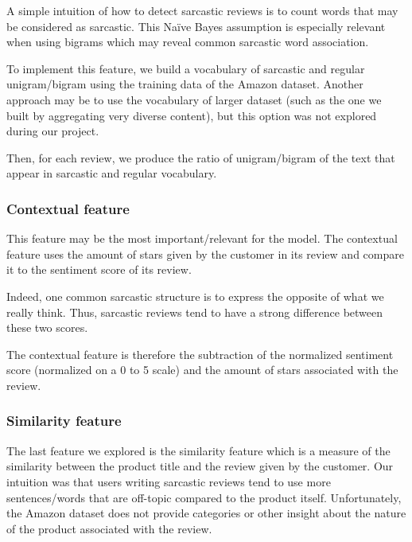 \documentclass[10pt,twocolumn,letterpaper]{article}
\begin{document}
A simple intuition of how to detect sarcastic reviews is to count words that may be considered as sarcastic.
This Naïve Bayes assumption is especially relevant when using bigrams which may reveal common sarcastic word association.

To implement this feature, we build a vocabulary of sarcastic and regular unigram/bigram using the training data of the Amazon dataset.
Another approach may  be to use the vocabulary of larger dataset (such as the one we built by aggregating very diverse content), but this option was not explored during our project.

Then, for each review, we produce the ratio of unigram/bigram of the text that appear in sarcastic and regular vocabulary.

\subsubsection{Contextual feature}

This feature may be the most important/relevant for the model.
The contextual feature uses the amount of stars given by the customer in its review and compare it to the sentiment score of its review.

Indeed, one common sarcastic structure is to express the opposite of what we really think.
Thus, sarcastic reviews tend to have a strong difference between these two scores.

The contextual feature is therefore the subtraction of the normalized sentiment score (normalized on a 0 to 5 scale) and the amount of stars associated with the review.

\subsubsection{Similarity feature}

The last feature we explored is the similarity feature which is a measure of the similarity between the product title and the review given by the customer.
Our intuition was that users writing sarcastic reviews tend to use more sentences/words that are off-topic compared to the product itself.
Unfortunately, the Amazon dataset does not provide categories or other insight about the nature of the product associated with the review.
\end{document}
